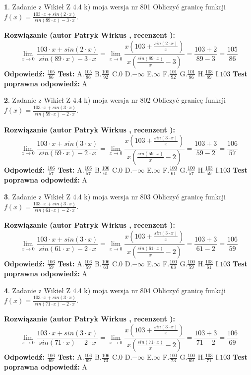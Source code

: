 \documentclass[12pt, a4paper]{article}
\theoremstyle{definition} %
\newtheorem{zad}{}
\newcommand{\zadStart}[1]{\begin{zad}#1\newline}
\newcommand{\zadStop}{\end{zad}}
\newcommand{\rozwStart}[2]{\noindent \textbf{Rozwiązanie (autor #1 , recenzent #2): }\newline}
\newcommand{\rozwStop}{\newline}
\newcommand{\odpStart}{\noindent \textbf{Odpowiedź:}\newline}
\newcommand{\odpStop}{\newline}
\newcommand{\testStart}{\noindent \textbf{Test:}\newline}
\newcommand{\testStop}{\newline}
\newcommand{\kluczStart}{\noindent \textbf{Test poprawna odpowiedź:}\newline}
\newcommand{\kluczStop}{\newline}
\begin{document}
\zadStart{Zadanie z Wikieł Z 4.4 k) moja wersja nr 801}
Obliczyć granicę funkcji $f(x)=\frac{103\cdot x +sin(2\cdot x)}{sin(89\cdot x) -3\cdot x}$.
\zadStop
\rozwStart{Patryk Wirkus}{}
$$\lim\limits_{x\to 0}\frac{103\cdot x +sin(2\cdot x)}{sin(89\cdot x) -3\cdot x}
=\lim\limits_{x\to 0}\frac{x(103+\frac{sin(2\cdot x)}{x})}{x(\frac{sin(89\cdot x)}{x}-3)}
=\frac{103+2}{89-3} = \frac{105}{86}$$
\rozwStop
\odpStart
$\frac{105}{86}$
\odpStop
\testStart
A.$\frac{105}{86}$
B.$\frac{105}{92}$
C.$0$
D.$-\infty$
E.$\infty$
F.$\frac{101}{92}$
G.$\frac{101}{86}$
H.$\frac{103}{89}$
I.$103$
\testStop
\kluczStart
A
\kluczStop



\zadStart{Zadanie z Wikieł Z 4.4 k) moja wersja nr 802}
Obliczyć granicę funkcji $f(x)=\frac{103\cdot x +sin(3\cdot x)}{sin(59\cdot x) -2\cdot x}$.
\zadStop
\rozwStart{Patryk Wirkus}{}
$$\lim\limits_{x\to 0}\frac{103\cdot x +sin(3\cdot x)}{sin(59\cdot x) -2\cdot x}
=\lim\limits_{x\to 0}\frac{x(103+\frac{sin(3\cdot x)}{x})}{x(\frac{sin(59\cdot x)}{x}-2)}
=\frac{103+3}{59-2} = \frac{106}{57}$$
\rozwStop
\odpStart
$\frac{106}{57}$
\odpStop
\testStart
A.$\frac{106}{57}$
B.$\frac{106}{61}$
C.$0$
D.$-\infty$
E.$\infty$
F.$\frac{100}{61}$
G.$\frac{100}{57}$
H.$\frac{103}{59}$
I.$103$
\testStop
\kluczStart
A
\kluczStop



\zadStart{Zadanie z Wikieł Z 4.4 k) moja wersja nr 803}
Obliczyć granicę funkcji $f(x)=\frac{103\cdot x +sin(3\cdot x)}{sin(61\cdot x) -2\cdot x}$.
\zadStop
\rozwStart{Patryk Wirkus}{}
$$\lim\limits_{x\to 0}\frac{103\cdot x +sin(3\cdot x)}{sin(61\cdot x) -2\cdot x}
=\lim\limits_{x\to 0}\frac{x(103+\frac{sin(3\cdot x)}{x})}{x(\frac{sin(61\cdot x)}{x}-2)}
=\frac{103+3}{61-2} = \frac{106}{59}$$
\rozwStop
\odpStart
$\frac{106}{59}$
\odpStop
\testStart
A.$\frac{106}{59}$
B.$\frac{106}{63}$
C.$0$
D.$-\infty$
E.$\infty$
F.$\frac{100}{63}$
G.$\frac{100}{59}$
H.$\frac{103}{61}$
I.$103$
\testStop
\kluczStart
A
\kluczStop



\zadStart{Zadanie z Wikieł Z 4.4 k) moja wersja nr 804}
Obliczyć granicę funkcji $f(x)=\frac{103\cdot x +sin(3\cdot x)}{sin(71\cdot x) -2\cdot x}$.
\zadStop
\rozwStart{Patryk Wirkus}{}
$$\lim\limits_{x\to 0}\frac{103\cdot x +sin(3\cdot x)}{sin(71\cdot x) -2\cdot x}
=\lim\limits_{x\to 0}\frac{x(103+\frac{sin(3\cdot x)}{x})}{x(\frac{sin(71\cdot x)}{x}-2)}
=\frac{103+3}{71-2} = \frac{106}{69}$$
\rozwStop
\odpStart
$\frac{106}{69}$
\odpStop
\testStart
A.$\frac{106}{69}$
B.$\frac{106}{73}$
C.$0$
D.$-\infty$
E.$\infty$
F.$\frac{100}{73}$
G.$\frac{100}{69}$
H.$\frac{103}{71}$
I.$103$
\testStop
\kluczStart
A
\kluczStop
\end{document}
